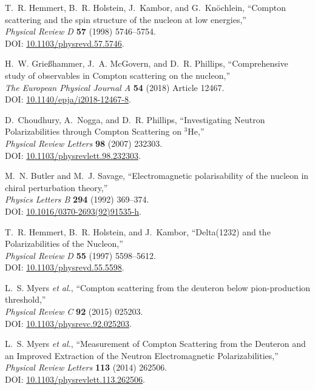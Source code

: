 \documentclass[12pt]{article}
\newcommand{\3}{\ss}
\numberwithin{equation}{section}
\begin{document}
\begin{thebibliography}{44}
T.~R. Hemmert, B.~R. Holstein, J.~Kambor, and G.~Knöchlein, 
``Compton scattering and the spin structure of the nucleon at low energies,''\\ 
\textit{Physical Review D} \textbf{57} (1998) 5746–5754.\\ 
DOI: \href{http://dx.doi.org/10.1103/physrevd.57.5746}{10.1103/physrevd.57.5746}.

H.~W. Grießhammer, J.~A. McGovern, and D.~R. Phillips, 
``Comprehensive study of observables in Compton scattering on the nucleon,''\\ 
\textit{The European Physical Journal A} \textbf{54} (2018) Article 12467.\\ 
DOI: \href{http://dx.doi.org/10.1140/epja/i2018-12467-8}{10.1140/epja/i2018-12467-8}.

D.~Choudhury, A.~Nogga, and D.~R. Phillips, 
``Investigating Neutron Polarizabilities through Compton Scattering on $^3$He,''\\ 
\textit{Physical Review Letters} \textbf{98} (2007) 232303.\\ 
DOI: \href{http://dx.doi.org/10.1103/physrevlett.98.232303}{10.1103/physrevlett.98.232303}.

M.~N. Butler and M.~J. Savage, 
``Electromagnetic polarisability of the nucleon in chiral perturbation theory,''\\ 
\textit{Physics Letters B} \textbf{294} (1992) 369–374.\\ 
DOI: \href{http://dx.doi.org/10.1016/0370-2693(92)91535-h}{10.1016/0370-2693(92)91535-h}.

T.~R. Hemmert, B.~R. Holstein, and J.~Kambor, 
``Delta(1232) and the Polarizabilities of the Nucleon,''\\ 
\textit{Physical Review D} \textbf{55} (1997) 5598–5612.\\ 
DOI: \href{http://dx.doi.org/10.1103/physrevd.55.5598}{10.1103/physrevd.55.5598}.

L.~S. Myers \textit{et al.}, 
``Compton scattering from the deuteron below pion-production threshold,''\\ 
\textit{Physical Review C} \textbf{92} (2015) 025203.\\ 
DOI: \href{http://dx.doi.org/10.1103/physrevc.92.025203}{10.1103/physrevc.92.025203}.

L.~S. Myers \textit{et al.}, 
``Measurement of Compton Scattering from the Deuteron and an Improved Extraction of the Neutron Electromagnetic Polarizabilities,''\\ 
\textit{Physical Review Letters} \textbf{113} (2014) 262506.\\ 
DOI: \href{http://dx.doi.org/10.1103/physrevlett.113.262506}{10.1103/physrevlett.113.262506}.


\end{thebibliography}
\end{document}
